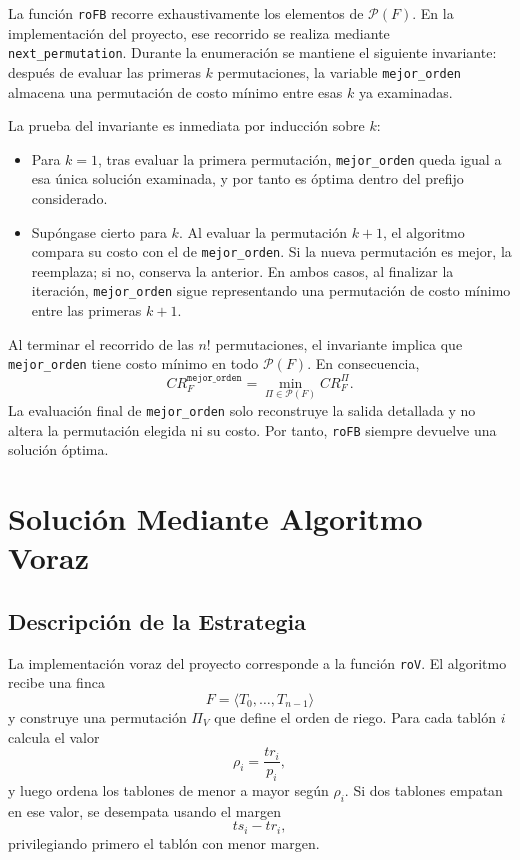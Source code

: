 \documentclass[12pt,a4paper]{article}
\begin{document}
La funci\'on \texttt{roFB} recorre exhaustivamente los elementos de \(\mathcal{P}(F)\).
En la implementaci\'on del proyecto, ese recorrido se realiza mediante \texttt{next\_permutation}.
Durante la enumeraci\'on se mantiene el siguiente invariante: despu\'es de evaluar las primeras \(k\) permutaciones, la variable \texttt{mejor\_orden} almacena una permutaci\'on de costo m\'inimo entre esas \(k\) ya examinadas.

La prueba del invariante es inmediata por inducci\'on sobre \(k\):
\begin{itemize}
  \item Para \(k=1\), tras evaluar la primera permutaci\'on, \texttt{mejor\_orden} queda igual a esa \'unica soluci\'on examinada, y por tanto es \'optima dentro del prefijo considerado.
  \item Sup\'ongase cierto para \(k\). Al evaluar la permutaci\'on \(k+1\), el algoritmo compara su costo con el de \texttt{mejor\_orden}. Si la nueva permutaci\'on es mejor, la reemplaza; si no, conserva la anterior. En ambos casos, al finalizar la iteraci\'on, \texttt{mejor\_orden} sigue representando una permutaci\'on de costo m\'inimo entre las primeras \(k+1\).
\end{itemize}

Al terminar el recorrido de las \(n!\) permutaciones, el invariante implica que \texttt{mejor\_orden} tiene costo m\'inimo en todo \(\mathcal{P}(F)\). En consecuencia,
\[
CR_F^{\texttt{mejor\_orden}}=\min_{\Pi \in \mathcal{P}(F)} CR_F^\Pi.
\]
La evaluaci\'on final de \texttt{mejor\_orden} solo reconstruye la salida detallada y no altera la permutaci\'on elegida ni su costo. Por tanto, \texttt{roFB} siempre devuelve una soluci\'on \'optima.

\section{Soluci\'on Mediante Algoritmo Voraz}

\subsection{Descripci\'on de la Estrategia}

La implementaci\'on voraz del proyecto corresponde a la funci\'on \texttt{roV}. El algoritmo recibe una finca
\[
F=\langle T_0,\dots,T_{n-1}\rangle
\]
y construye una permutaci\'on \(\Pi_V\) que define el orden de riego. Para cada tabl\'on \(i\) calcula el valor
\[
\rho_i=\frac{tr_i}{p_i},
\]
y luego ordena los tablones de menor a mayor seg\'un \(\rho_i\). Si dos tablones empatan en ese valor, se desempata usando el margen
\[
ts_i - tr_i,
\]
privilegiando primero el tabl\'on con menor margen.
\end{document}

